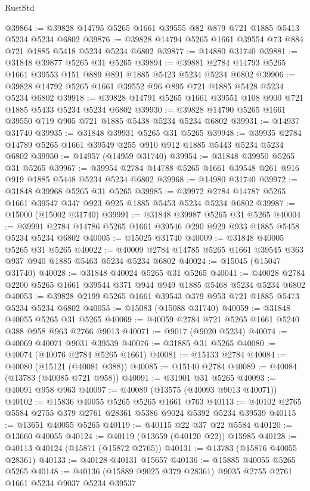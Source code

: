 \begin{lexlean}{RustStd}
\begin{coremodule}
@39864 := @39828 @14795 @5265 @1661 @39555 @82 @879 @721 @1885 @5413 @5234 @5234 @6802
@39876 := @39828 @14794 @5265 @1661 @39554 @73 @884 @721 @1885 @5418 @5234 @5234 @6802
@39877 := @14880 @31740
@39881 := @31848 @39877 @5265 @31 @5265
@39894 := @39881 @2784 @14793 @5265 @1661 @39553 @151 @889 @891 @1885 @5423 @5234 @5234 @6802
@39906 := @39828 @14792 @5265 @1661 @39552 @96 @895 @721 @1885 @5428 @5234 @5234 @6802
@39918 := @39828 @14791 @5265 @1661 @39551 @108 @900 @721 @1885 @5433 @5234 @5234 @6802
@39930 := @39828 @14790 @5265 @1661 @39550 @719 @905 @721 @1885 @5438 @5234 @5234 @6802
@39931 := @14937 @31740
@39935 := @31848 @39931 @5265 @31 @5265
@39948 := @39935 @2784 @14789 @5265 @1661 @39549 @255 @910 @912 @1885 @5443 @5234 @5234 @6802
@39950 := @14957 (@14959 @31740)
@39954 := @31848 @39950 @5265 @31 @5265
@39967 := @39954 @2784 @14788 @5265 @1661 @39548 @261 @916 @919 @1885 @5448 @5234 @5234 @6802
@39968 := @14980 @31740
@39972 := @31848 @39968 @5265 @31 @5265
@39985 := @39972 @2784 @14787 @5265 @1661 @39547 @347 @923 @925 @1885 @5453 @5234 @5234 @6802
@39987 := @15000 (@15002 @31740)
@39991 := @31848 @39987 @5265 @31 @5265
@40004 := @39991 @2784 @14786 @5265 @1661 @39546 @290 @929 @933 @1885 @5458 @5234 @5234 @6802
@40005 := @15025 @31740
@40009 := @31848 @40005 @5265 @31 @5265
@40022 := @40009 @2784 @14785 @5265 @1661 @39545 @363 @937 @940 @1885 @5463 @5234 @5234 @6802
@40024 := @15045 (@15047 @31740)
@40028 := @31848 @40024 @5265 @31 @5265
@40041 := @40028 @2784 @2200 @5265 @1661 @39544 @371 @944 @949 @1885 @5468 @5234 @5234 @6802
@40053 := @39828 @2199 @5265 @1661 @39543 @379 @953 @721 @1885 @5473 @5234 @5234 @6802
@40055 := @15083 (@15088 @31740)
@40059 := @31848 @40055 @5265 @31 @5265
@40069 := @40059 @2784 @721 @5265 @1661 @5240 @388 @958 @963 @2766 @9013
@40071 := @9017 (@9020 @5234)
@40074 := @40069 @40071 @9031 @39539
@40076 := @31885 @31 @5265
@40080 := @40074 (@40076 @2784 @5265 @1661)
@40081 := @15133 @2784
@40084 := @40080 (@15121 (@40081 @388))
@40085 := @15140 @2784
@40089 := @40084 (@13783 (@40085 @721 @958))
@40091 := @31901 @31 @5265
@40093 := @40091 @958 @963
@40097 := @40089 (@13575 (@40093 @9013 @40071))
@40102 := @15836 @40055 @5265 @5265 @1661 @763
@40113 := @40102 @2765 @5584 @2755 @379 @2761 @28361 @5386 @9024 @5392 @5234 @39539
@40115 := @13651 @40055 @5265
@40119 := @40115 @22 @37 @22 @5584
@40120 := @13660 @40055
@40124 := @40119 (@13659 (@40120 @22)) @15985
@40128 := @40113 @40124 (@15871 (@15872 @2765))
@40131 := @13783 (@15876 @40055 @28361)
@40133 := @40128 @40131 @15657
@40136 := @15885 @40055 @5265 @5265
@40148 := @40136 (@15889 @9025 @379 @28361) @9035 @2755 @2761 @1661 @5234 @9037 @5234 @39537

\end{coremodule}
\end{lexlean}
